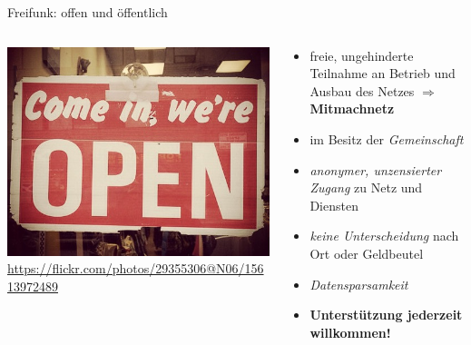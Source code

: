 \documentclass[10pt]{beamer}
\begin{document}
    \begin{frame}{Freifunk: offen und öffentlich}
    \begin{columns}[c]
      \begin{column}{5cm}
        \includegraphics[width=\textwidth]{images/open}
        \newline \tiny \url{https://flickr.com/photos/29355306@N06/15613972489}
      \end{column}
      \begin{column}{7cm}
        \begin{itemize}
          \item freie, ungehinderte Teilnahme an Betrieb und Ausbau des Netzes $\Rightarrow$ \textbf{Mitmachnetz}
          \item im Besitz der \textit{Gemeinschaft}
          \item \textit{anonymer, unzensierter Zugang} zu Netz und Diensten
          \item \textit{keine Unterscheidung} nach Ort oder Geldbeutel
          \item \textit{Datensparsamkeit}
          \item \textbf{Unterstützung jederzeit willkommen!}
        \end{itemize}
      \end{column}
    \end{columns}
  \end{frame}
\end{document}
